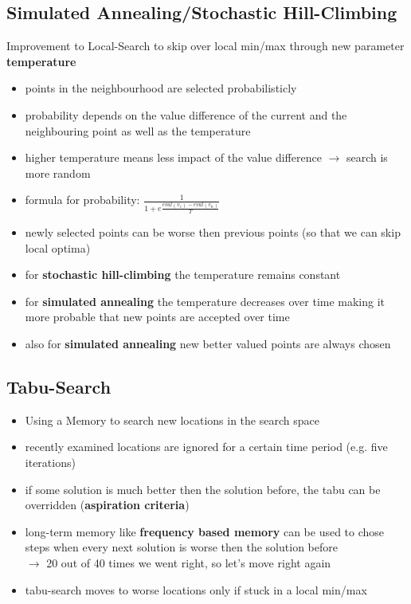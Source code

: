 \documentclass[12pt,a4paper]{article}
\begin{document}
\subsection{Simulated Annealing/Stochastic Hill-Climbing}
Improvement to Local-Search to skip over local min/max through new parameter \textbf{temperature}
\begin{itemize}
\item points in the neighbourhood are selected probabilisticly
\item probability depends on the value difference of the current and the neighbouring point as well as the temperature
\item higher temperature means less impact of the value difference $\rightarrow$ search is more random
\item formula for probability: $\frac{1}{1+e \frac{eval(v_c)-eval(v_n)}{T}}$
\item newly selected points can be worse then previous points (so that we can skip local optima)
\item for \textbf{stochastic hill-climbing} the temperature remains constant
\item for \textbf{simulated annealing} the temperature decreases over time making it more probable that new points are accepted over time
\item also for \textbf{simulated annealing} new better valued points are always chosen
\end{itemize}


\subsection{Tabu-Search}


\begin{itemize}
\item Using a Memory to search new locations in the search space
\item recently examined locations are ignored for a certain time period (e.g. five iterations)
\item if some solution is much better then the solution before, the tabu can be overridden (\textbf{aspiration criteria})
\item long-term memory like \textbf{frequency based memory} can be used to chose steps when every next solution is worse then the solution before\\$\rightarrow$ 20 out of 40 times we went right, so let's move right again
\item tabu-search moves to worse locations only if stuck in a local min/max
\end{itemize}
\end{document}

